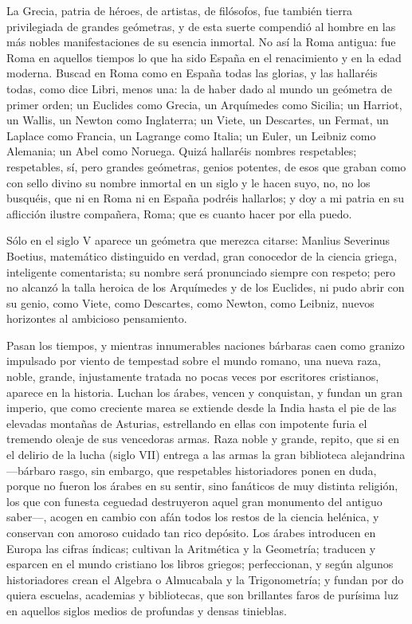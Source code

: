 \documentclass[a4paper, 12pt]{article}
\begin{document}
La Grecia, patria de héroes, de artistas, de filósofos, fue también tierra privilegiada de grandes geómetras, y de esta suerte compendió al hombre en las más nobles manifestaciones de su esencia inmortal.  No así la Roma antigua: fue Roma en aquellos tiempos lo que ha sido España en el renacimiento y en la edad moderna.  Buscad en Roma como en España todas las glorias, y las hallaréis todas, como dice Libri, menos una: la de haber dado al mundo un geómetra de primer orden; un Euclides como Grecia, un Arquímedes como Sicilia; un Harriot, un Wallis, un Newton como Inglaterra; un Viete, un Descartes, un Fermat, un Laplace como Francia, un Lagrange como Italia; un Euler, un Leibniz como Alemania; un Abel como Noruega.  Quizá hallaréis nombres respetables; respetables, sí, pero grandes geómetras, genios potentes, de esos que graban como con sello divino su nombre inmortal en un siglo y le hacen suyo, no, no los busquéis, que ni en Roma ni en España podréis hallarlos; y doy a mi patria en su aflicción ilustre compañera, Roma; que es cuanto hacer por ella puedo.

Sólo en el siglo V aparece un geómetra que merezca citarse: Manlius Severinus Boetius, matemático distinguido en verdad, gran conocedor de la ciencia griega, inteligente comentarista; su nombre será pronunciado siempre con respeto; pero no alcanzó la talla heroica de los Arquímedes y de los Euclides, ni pudo abrir con su genio, como Viete, como Descartes, como Newton, como Leibniz, nuevos horizontes al ambicioso pensamiento.

Pasan los tiempos, y mientras innumerables naciones bárbaras caen como granizo impulsado por viento de tempestad sobre el mundo romano, una nueva raza, noble, grande, injustamente tratada no pocas veces por escritores cristianos, aparece en la historia.  Luchan los árabes, vencen y conquistan, y fundan un gran imperio, que como creciente marea se extiende desde la India hasta el pie de las elevadas montañas de Asturias, estrellando en ellas con impotente furia el tremendo oleaje de sus vencedoras armas.  Raza noble y grande, repito, que si en el delirio de la lucha (siglo VII) entrega a las armas la gran biblioteca alejandrina ---bárbaro rasgo, sin embargo, que respetables historiadores ponen en duda, porque no fueron los árabes en su sentir, sino fanáticos de muy distinta religión, los que con funesta ceguedad destruyeron aquel gran monumento del antiguo saber---, acogen en cambio con afán todos los restos de la ciencia helénica, y conservan con amoroso cuidado tan rico depósito.  Los árabes introducen en Europa las cifras índicas; cultivan la Aritmética y la Geometría; traducen y esparcen en el mundo cristiano los libros griegos; perfeccionan, y según algunos historiadores crean el Algebra o Almucabala y la Trigonometría; y fundan por do quiera escuelas, academias y bibliotecas, que son brillantes faros de purísima luz en aquellos siglos medios de profundas y densas tinieblas.
\end{document}

